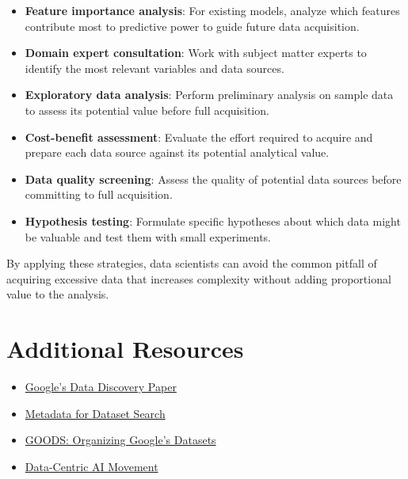 \documentclass[12pt]{article}
\begin{document}
\begin{enumerate}
\begin{tcolorbox}[colback=blue!5!white,colframe=blue!75!black,title=Solution]
\begin{itemize}
        \item \textbf{Feature importance analysis}: For existing models, analyze which features contribute most to predictive power to guide future data acquisition.
        
        \item \textbf{Domain expert consultation}: Work with subject matter experts to identify the most relevant variables and data sources.
        
        \item \textbf{Exploratory data analysis}: Perform preliminary analysis on sample data to assess its potential value before full acquisition.
        
        \item \textbf{Cost-benefit assessment}: Evaluate the effort required to acquire and prepare each data source against its potential analytical value.
        
        \item \textbf{Data quality screening}: Assess the quality of potential data sources before committing to full acquisition.
        
        \item \textbf{Hypothesis testing}: Formulate specific hypotheses about which data might be valuable and test them with small experiments.
    \end{itemize}
    
    By applying these strategies, data scientists can avoid the common pitfall of acquiring excessive data that increases complexity without adding proportional value to the analysis.
    \end{tcolorbox}
\end{enumerate}

\section{Additional Resources}

\begin{itemize}
    \item \href{https://storage.googleapis.com/pub-tools-public-publication-data/pdf/afd0602172f297bccdb4ee720bc3832e90e62042.pdf}{Google's Data Discovery Paper}
    \item \href{https://storage.googleapis.com/pub-tools-public-publication-data/pdf/45390.pdf}{Metadata for Dataset Search}
    \item \href{https://static.googleusercontent.com/media/research.google.com/en//pubs/archive/45a9dcf23dbdfa24dbced358f825636c58518afa.pdf}{GOODS: Organizing Google's Datasets}
    \item \href{https://datacentricai.org/}{Data-Centric AI Movement}
\end{itemize}
\end{document}
